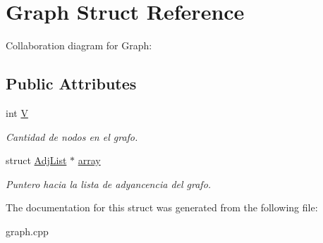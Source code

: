 \hypertarget{structGraph}{}\section{Graph Struct Reference}
\label{structGraph}


Collaboration diagram for Graph\+:
\subsection*{Public Attributes}
\begin{DoxyCompactItemize}
\item 
\mbox{\label{structGraph_a2b722f7cfa7a21e4cb5fae488b3d4dcc}} 
int \hyperlink{structGraph_a2b722f7cfa7a21e4cb5fae488b3d4dcc}{V}
\begin{DoxyCompactList}\small\item\em Cantidad de nodos en el grafo. \end{DoxyCompactList}\item 
\mbox{\label{structGraph_a33138cfe84bb21a940ad2aa9a1a8c9eb}} 
struct \hyperlink{structAdjList}{Adj\+List} $\ast$ \hyperlink{structGraph_a33138cfe84bb21a940ad2aa9a1a8c9eb}{array}
\begin{DoxyCompactList}\small\item\em Puntero hacia la lista de adyancencia del grafo. \end{DoxyCompactList}\end{DoxyCompactItemize}


The documentation for this struct was generated from the following file\+:\begin{DoxyCompactItemize}
\item 
graph.\+cpp\end{DoxyCompactItemize}
